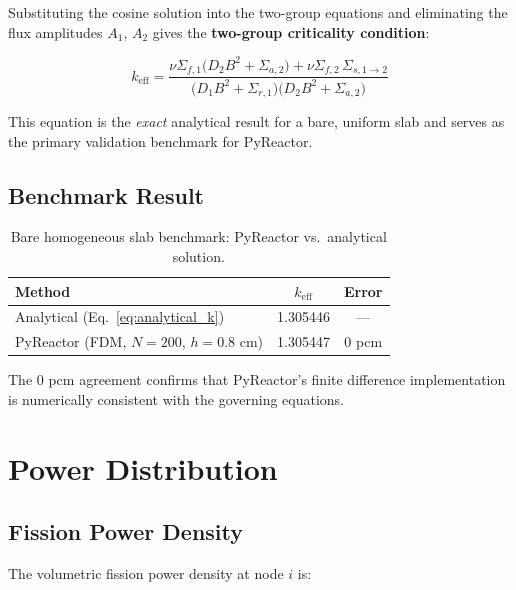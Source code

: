 \documentclass[12pt,a4paper]{article}
\newcommand{\keff}{k_{\mathrm{eff}}}
\newcommand{\sigr}[1]{\Sigma_{r,#1}}
\newcommand{\siga}[1]{\Sigma_{a,#1}}
\newcommand{\sigs}[2]{\Sigma_{s,#1\to#2}}
\newcommand{\sigf}[1]{\nu\Sigma_{f,#1}}
\newcommand{\diff}[1]{D_{#1}}
\begin{document}
Substituting the cosine solution into the two-group equations
and eliminating the flux amplitudes $A_1$, $A_2$ gives the
\textbf{two-group criticality condition}:

\begin{eqbox}
\begin{equation}
  \keff = \frac{\sigf{1}\bigl(\diff{2}B^2 + \siga{2}\bigr)
               + \sigf{2}\,\sigs{1}{2}}
              {\bigl(\diff{1}B^2 + \sigr{1}\bigr)
               \bigl(\diff{2}B^2 + \siga{2}\bigr)}
  \label{eq:analytical_k}
\end{equation}
\end{eqbox}

This equation is the \textit{exact} analytical result for a bare,
uniform slab and serves as the primary validation benchmark for PyReactor.

\subsection{Benchmark Result}

\begin{table}[h!]
\centering
\begin{tabular}{lcc}
\toprule
\textbf{Method} & \textbf{$\keff$} & \textbf{Error} \\
\midrule
Analytical (Eq.~\ref{eq:analytical_k}) & 1.305446 & — \\
PyReactor (FDM, $N=200$, $h=0.8$ cm)   & 1.305447 & 0 pcm \\
\bottomrule
\end{tabular}
\caption{Bare homogeneous slab benchmark: PyReactor vs.\ analytical solution.}
\end{table}

The 0 pcm agreement confirms that PyReactor's finite difference
implementation is numerically consistent with the governing equations.

\section{Power Distribution}

\subsection{Fission Power Density}

The volumetric fission power density at node $i$ is:
\end{document}
